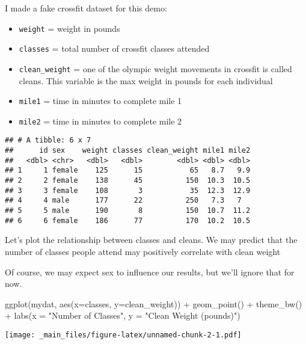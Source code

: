 \documentclass[
]{book}
\newenvironment{Shaded}{\begin{snugshade}}{\end{snugshade}}
\newcommand{\AttributeTok}[1]{\textcolor[rgb]{0.77,0.63,0.00}{#1}}
\newcommand{\FunctionTok}[1]{\textcolor[rgb]{0.00,0.00,0.00}{#1}}
\newcommand{\NormalTok}[1]{#1}
\newcommand{\SpecialCharTok}[1]{\textcolor[rgb]{0.00,0.00,0.00}{#1}}
\newcommand{\StringTok}[1]{\textcolor[rgb]{0.31,0.60,0.02}{#1}}
\providecommand{\tightlist}{%
  \setlength{\itemsep}{0pt}\setlength{\parskip}{0pt}}
\begin{document}
I made a fake crossfit dataset for this demo:

\begin{itemize}
\tightlist
\item
  \texttt{weight} = weight in pounds
\item
  \texttt{classes} = total number of crossfit classes attended
\item
  \texttt{clean\_weight} = one of the olympic weight movements in crossfit is called cleans. This variable is the max weight in pounds for each individual
\item
  \texttt{mile1} = time in minutes to complete mile 1
\item
  \texttt{mile2} = time in minutes to complete mile 2
\end{itemize}

\begin{verbatim}
## # A tibble: 6 x 7
##      id sex    weight classes clean_weight mile1 mile2
##   <dbl> <chr>   <dbl>   <dbl>        <dbl> <dbl> <dbl>
## 1     1 female    125      15           65   8.7   9.9
## 2     2 female    138      45          150  10.3  10.5
## 3     3 female    108       3           35  12.3  12.9
## 4     4 male      177      22          250   7.3   7  
## 5     5 male      190       8          150  10.7  11.2
## 6     6 female    186      77          170  10.2  10.5
\end{verbatim}

Let's plot the relationship between classes and cleans. We may predict that the number of classes people attend may positively correlate with clean weight

Of course, we may expect sex to influence our results, but we'll ignore that for now.

\begin{Shaded}
\begin{Highlighting}[]
\FunctionTok{ggplot}\NormalTok{(mydat, }\FunctionTok{aes}\NormalTok{(}\AttributeTok{x=}\NormalTok{classes, }\AttributeTok{y=}\NormalTok{clean\_weight)) }\SpecialCharTok{+}
  \FunctionTok{geom\_point}\NormalTok{() }\SpecialCharTok{+}
  \FunctionTok{theme\_bw}\NormalTok{() }\SpecialCharTok{+}
  \FunctionTok{labs}\NormalTok{(}\AttributeTok{x =} \StringTok{"Number of Classes"}\NormalTok{, }\AttributeTok{y =} \StringTok{"Clean Weight (pounds)"}\NormalTok{)}
\end{Highlighting}
\end{Shaded}

\texttt{[image: \_main\_files/figure-latex/unnamed-chunk-2-1.pdf]}
\end{document}
